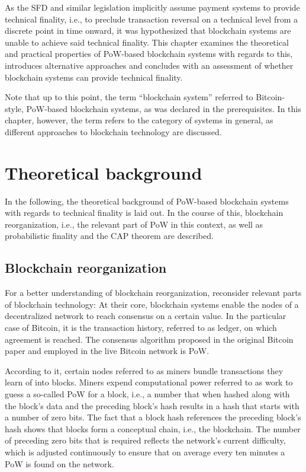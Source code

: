 As the SFD and similar legislation implicitly assume payment systems to provide technical finality, i.e., to preclude transaction reversal on a technical level from a discrete point in time onward, it was hypothesized that blockchain systems are unable to achieve said technical finality.
This chapter examines the theoretical and practical properties of PoW-based blockchain systems with regards to this, introduces alternative approaches and concludes with an assessment of whether blockchain systems can provide technical finality.

Note that up to this point, the term ``blockchain system'' referred to Bitcoin-style, PoW-based blockchain systems, as was declared in the prerequisites.
In this chapter, however, the term refers to the category of systems in general, as different approaches to blockchain technology are discussed.

\section{Theoretical background}

In the following, the theoretical background of PoW-based blockchain systems with regards to technical finality is laid out.
In the course of this, blockchain reorganization, i.e., the relevant part of PoW in this context, as well as probabilistic finality and the CAP theorem are described.

\subsection{Blockchain reorganization}

For a better understanding of blockchain reorganization, reconsider relevant parts of blockchain technology:
At their core, blockchain systems enable the nodes of a decentralized network to reach consensus on a certain value.
In the particular case of Bitcoin, it is the transaction history, referred to as ledger, on which agreement is reached.
The consensus algorithm proposed in the original Bitcoin paper and employed in the live Bitcoin network is PoW.

According to it, certain nodes referred to as miners bundle transactions they learn of into blocks.
Miners expend computational power referred to as work to guess a so-called PoW for a block, i.e., a number that when hashed along with the block's data and the preceding block's hash results in a hash that starts with a number of zero bits.
The fact that a block hash references the preceding block's hash shows that blocks form a conceptual chain, i.e., the blockchain.
The number of preceding zero bits that is required reflects the network's current difficulty, which is adjusted continuously to ensure that on average every ten minutes a PoW is found on the network. 

